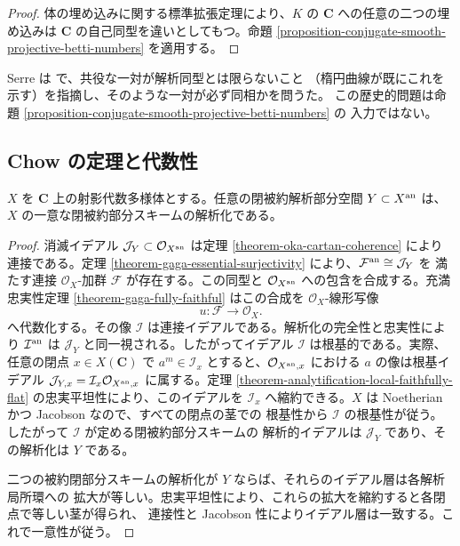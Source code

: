 \begin{proof}
体の埋め込みに関する標準拡張定理により、$K$ の $\mathbf C$ への任意の二つの埋め込みは
$\mathbf C$ の自己同型を違いとしてもつ。命題
\ref{proposition-conjugate-smooth-projective-betti-numbers} を適用する。
\end{proof}

\begin{remark}[歴史的範囲]
\label{remark-conjugate-varieties-historical}
Serre は \cite[\S 4、第18項]{GAGA} で、共役な一対が解析同型とは限らないこと
（楕円曲線が既にこれを示す）を指摘し、そのような一対が必ず同相かを問うた。
この歴史的問題は命題 \ref{proposition-conjugate-smooth-projective-betti-numbers} の
入力ではない。
\end{remark}


\subsection{Chow の定理と代数性}
\label{subsection-gaga-chow}

\begin{theorem}[Chow]
\label{theorem-chow-closed-analytic-projective}
\begin{reference}
\cite[\S 4、第19項、命題13]{GAGA}
\end{reference}
$X$ を $\mathbf C$ 上の射影代数多様体とする。任意の閉被約解析部分空間
$Y\subset X^{\rm an}$ は、$X$ の一意な閉被約部分スキームの解析化である。
\end{theorem}

\begin{proof}
消滅イデアル $\mathcal J_Y\subset\mathcal O_{X^{\rm an}}$ は定理
\ref{theorem-oka-cartan-coherence} により連接である。定理
\ref{theorem-gaga-essential-surjectivity} により、$\mathcal F^{\rm an}\cong\mathcal J_Y$ を
満たす連接 $\mathcal O_X$-加群 $\mathcal F$ が存在する。この同型と
$\mathcal O_{X^{\rm an}}$ への包含を合成する。充満忠実性定理
\ref{theorem-gaga-fully-faithful} はこの合成を $\mathcal O_X$-線形写像
$$
u:\mathcal F\longrightarrow\mathcal O_X.
$$
へ代数化する。その像 $\mathcal I$ は連接イデアルである。解析化の完全性と忠実性により
$\mathcal I^{\rm an}$ は $\mathcal J_Y$ と同一視される。したがってイデアル
$\mathcal I$ は根基的である。実際、任意の閉点 $x\in X(\mathbf C)$ で
$a^m\in\mathcal I_x$ とすると、$\mathcal O_{X^{\rm an},x}$ における $a$ の像は根基イデアル
$\mathcal J_{Y,x}=\mathcal I_x\mathcal O_{X^{\rm an},x}$ に属する。定理
\ref{theorem-analytification-local-faithfully-flat} の忠実平坦性により、このイデアルを
$\mathcal I_x$ へ縮約できる。$X$ は Noetherian かつ Jacobson なので、すべての閉点の茎での
根基性から $\mathcal I$ の根基性が従う。したがって $\mathcal I$ が定める閉被約部分スキームの
解析的イデアルは $\mathcal J_Y$ であり、その解析化は $Y$ である。

二つの被約閉部分スキームの解析化が $Y$ ならば、それらのイデアル層は各解析局所環への
拡大が等しい。忠実平坦性により、これらの拡大を縮約すると各閉点で等しい茎が得られ、
連接性と Jacobson 性によりイデアル層は一致する。これで一意性が従う。
\end{proof}

